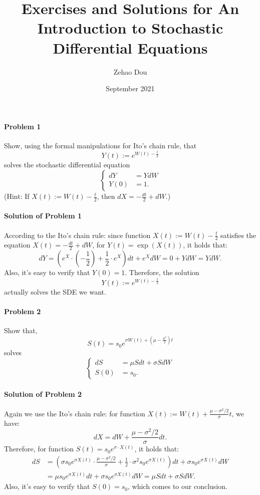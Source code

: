 \documentclass{article}
\title{Exercises and Solutions for \textbf{An Introduction to Stochastic Differential Equations}}
\author{Zehao Dou}
\date{September 2021}
\begin{document}
\allowdisplaybreaks[4]
\maketitle

\begin{abstract}

\end{abstract}
\newpage
\paragraph{Problem 1} Show, using the formal manipulations for Ito's chain rule, that
\[Y(t) := e^{W(t)-\frac{t}{2}}\]
solves the stochastic differential equation
\begin{equation*}
\begin{cases}
dY &= YdW\\
Y(0) &= 1.
\end{cases} 
\end{equation*}
(Hint: If $X(t):=W(t)-\frac{t}{2}$, then $dX=-\frac{dt}{2}+dW$.)

\paragraph{Solution of Problem 1}
According to the Ito's chain rule: since function $X(t):=W(t)-\frac{t}{2}$ satisfies the equation $X(t)=-\frac{dt}{2}+dW$, for $Y(t)=\exp(X(t))$, it holds that:
\[dY=\left(e^{X}\cdot\left(-\frac{1}{2}\right)+\frac12\cdot e^{X}\right)dt+e^{X}dW= 0+YdW=YdW.\]
Also, it's easy to verify that $Y(0)=1$. Therefore, the solution
\[Y(t) := e^{W(t)-\frac{t}{2}}\]
actually solves the SDE we want. 

\paragraph{Problem 2} Show that, 
\[S(t)=s_0e^{\sigma W(t)+\left(\mu-\frac{\sigma^2}{2}\right)t}\]
solves
\begin{equation*}
\begin{cases}
dS &= \mu Sdt + \sigma SdW\\
S(0) &= s_0.
\end{cases} 
\end{equation*}

\paragraph{Solution of Problem 2}
Again we use the Ito's chain rule: for function $X(t):= W(t)+\frac{\mu-\sigma^2/2}{\sigma}t$, we have:
\[dX= dW + \frac{\mu-\sigma^2/2}{\sigma} dt.\]
Therefore, for function $S(t)=s_0 e^{\sigma\cdot X(t)}$, it holds that:
\begin{equation*}
\begin{aligned}
dS &= \left(\sigma s_0 e^{\sigma X(t)}\cdot \frac{\mu-\sigma^2/2}{\sigma} +\frac12\cdot \sigma^2 s_0 e^{\sigma X(t)}\right)dt + \sigma s_0 e^{\sigma X(t)}dW\\
&= \mu s_0 e^{\sigma X(t)}dt + \sigma s_0 e^{\sigma X(t)}dW = \mu Sdt+\sigma SdW.
\end{aligned}    
\end{equation*}
Also, it's easy to verify that $S(0)=s_0$, which comes to our conclusion. 
\end{document}

